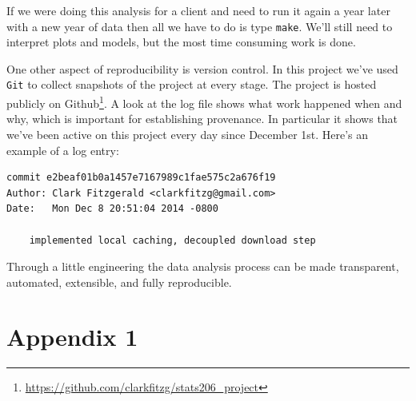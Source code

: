 \documentclass[12pt]{article}
\begin{document}
If we were doing this analysis for a client and need to run it again a year
later with a new year of data 
then all we have to do is type \texttt{make}. We'll still need to interpret
plots and models, but the most time consuming work is done.

One other aspect of reproducibility is version control. In this
project we've used \texttt{Git} to collect snapshots of the project at
every stage. The project is hosted publicly on
Github\footnote{\url{https://github.com/clarkfitzg/stats206\_project}}.
A look at the log file shows what work happened when and why,
which is important for establishing provenance. In particular it shows 
that we've been active on this project every day since
December 1st. Here's an example of a log entry:

\begin{verbatim}
commit e2beaf01b0a1457e7167989c1fae575c2a676f19
Author: Clark Fitzgerald <clarkfitzg@gmail.com>
Date:   Mon Dec 8 20:51:04 2014 -0800

    implemented local caching, decoupled download step
\end{verbatim}

Through a little engineering the data analysis process
can be made transparent, automated, extensible, and fully reproducible.

\section{Appendix 1}


\listoffigures
\end{document}
